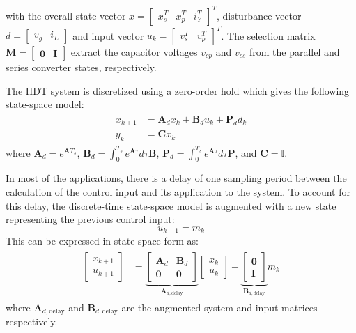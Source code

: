 with the overall state vector $x = \begin{bmatrix} x_s^T & x_p^T & i_Y^T \end{bmatrix}^T$, disturbance vector $d = \begin{bmatrix} v_g & i_L\end{bmatrix}$ and input vector $u_k = \begin{bmatrix} v_s^T & v_p^T \end{bmatrix}^T$. The selection matrix $\mathbf{M} = \begin{bmatrix} \mathbf{0} & \mathbf{I} \end{bmatrix}$ extract the capacitor voltages $v_{cp}$ and $v_{cs}$ from the parallel and series converter states, respectively.

The HDT system is discretized using a zero-order hold which gives the following state-space model:
\begin{align}
    \begin{aligned}
        x_{k + 1} &= \mathbf{A}_d x_k + \mathbf{B}_d u_k + \mathbf{P}_d d_k\\
        y_k &= \mathbf{C} x_k
    \end{aligned}
\end{align}
where $\mathbf{A}_d = e^{\mathbf{A}T_s}$, $\mathbf{B}_d = \int_0^{T_s} e^{\mathbf{A}\tau} d\tau \mathbf{B}$, $\mathbf{P}_d = \int_0^{T_s} e^{\mathbf{A}\tau} d\tau \mathbf{P}$, and $\mathbf{C} = \mathbb{I}$.

In most of the applications, there is a delay of one sampling period between the calculation of the control input and its application to the system. To account for this delay, the discrete-time state-space model is augmented with a new state representing the previous control input:
\begin{equation}
    u_{k + 1} = m_k 
\end{equation}
This can be expressed in state-space form as:
\begin{align}
    \begin{aligned}
        \begin{bmatrix}
            x_{k + 1}\\
            u_{k + 1}
        \end{bmatrix}
        &=
        \underbrace{
        \begin{bmatrix}
            \mathbf{A}_d & \mathbf{B}_d \\
            \mathbf{0} & \mathbf{0}
        \end{bmatrix}
        }_{\mathbf{A}_{d,\text{delay}}}
        \begin{bmatrix}
            x_k\\
            u_k
        \end{bmatrix}
        +
        \underbrace{
        \begin{bmatrix}
            \mathbf{0}\\
            \mathbf{I}
        \end{bmatrix}
        }_{\mathbf{B}_{d,\text{delay}}}
        m_k \label{eq:AugmentedModel}
    \end{aligned}
\end{align}
where $\mathbf{A}_{d,\text{delay}}$ and $\mathbf{B}_{d,\text{delay}}$ are the augmented system and input matrices respectively.